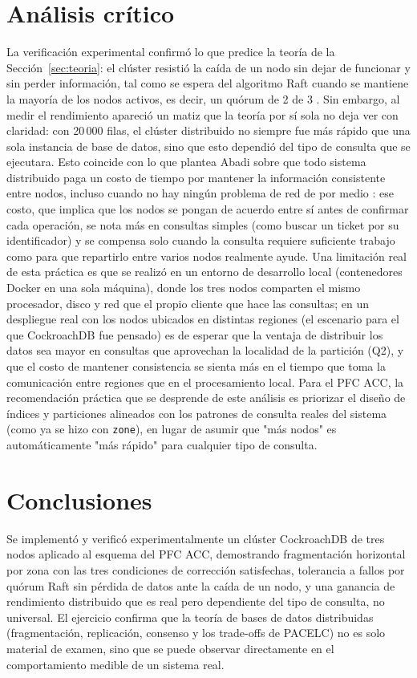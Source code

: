 \documentclass[11pt,a4paper]{article}
\begin{document}
\section{Análisis crítico}
\label{sec:analisis-critico}
La verificación experimental confirmó lo que predice la teoría de la
Sección~\ref{sec:teoria}: el clúster resistió la caída de un nodo sin dejar
de funcionar y sin perder información, tal como se espera del algoritmo
Raft cuando se mantiene la mayoría de los nodos activos, es decir, un
quórum de 2 de 3 \cite{ongaro2014}. Sin embargo, al medir el rendimiento
apareció un matiz que la teoría por sí sola no deja ver con claridad: con
20\,000 filas, el clúster distribuido no siempre fue más rápido que una
sola instancia de base de datos, sino que esto dependió del tipo de
consulta que se ejecutara. Esto coincide con lo que plantea Abadi sobre
que todo sistema distribuido paga un costo de tiempo por mantener la
información consistente entre nodos, incluso cuando no hay ningún
problema de red de por medio \cite{abadi2012}: ese costo, que implica que
los nodos se pongan de acuerdo entre sí antes de confirmar cada
operación, se nota más en consultas simples (como buscar un ticket
por su identificador) y se compensa solo cuando la consulta requiere
suficiente trabajo como para que repartirlo entre varios nodos realmente
ayude. Una limitación real de esta práctica es que se realizó en un
entorno de desarrollo local (contenedores Docker en una sola máquina),
donde los tres nodos comparten el mismo procesador, disco y red que el
propio cliente que hace las consultas; en un despliegue real con los
nodos ubicados en distintas regiones (el escenario para el que
CockroachDB fue pensado) es de esperar que la ventaja de distribuir
los datos sea mayor en consultas que aprovechan la localidad de la
partición (Q2), y que el costo de mantener consistencia se sienta más en
el tiempo que toma la comunicación entre regiones que en el procesamiento
local. Para el PFC ACC, la recomendación práctica que se desprende de
este análisis es priorizar el diseño de índices y particiones alineados
con los patrones de consulta reales del sistema (como ya se hizo con
\texttt{zone}), en lugar de asumir que "más nodos" es automáticamente
"más rápido" para cualquier tipo de consulta.

\section{Conclusiones}
\label{sec:conclusiones}

Se implementó y verificó experimentalmente un clúster CockroachDB de tres
nodos aplicado al esquema del PFC ACC, demostrando fragmentación horizontal
por zona con las tres condiciones de corrección satisfechas, tolerancia a
fallos por quórum Raft sin pérdida de datos ante la caída de un nodo, y una
ganancia de rendimiento distribuido que es real pero dependiente del tipo de
consulta, no universal. El ejercicio confirma que la teoría de bases de
datos distribuidas (fragmentación, replicación, consenso y los
trade-offs de PACELC) no es solo material de examen, sino que se puede
observar directamente en el comportamiento medible de un sistema real.
\end{document}
